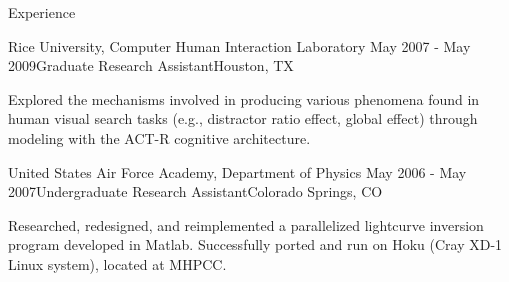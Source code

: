 \begin{rSection}{Experience}
  \begin{rSubsection}{Rice University, Computer Human Interaction Laboratory}
    {May 2007 - May 2009}{Graduate Research Assistant}{Houston, TX}
  \item Explored the mechanisms involved in producing various phenomena found in human visual search tasks
    (e.g., distractor ratio effect, global effect) through modeling with the ACT-R cognitive architecture. 
  \end{rSubsection}

  \begin{rSubsection}{United States Air Force Academy, Department of Physics}
    {May 2006 - May 2007}{Undergraduate Research Assistant}{Colorado Springs, CO}
  \item Researched, redesigned, and reimplemented a parallelized lightcurve inversion program developed in Matlab.
    Successfully ported and run on Hoku (Cray XD-1 Linux system), located at MHPCC.
  \end{rSubsection}


\end{rSection}
